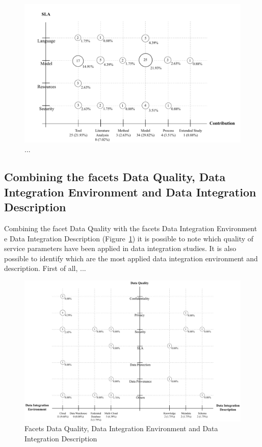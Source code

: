 \begin{figure}[h!]
\centering
\includegraphics[scale=0.7]{figs/bubble-charts/SLA-Contribution.pdf}
\caption{...}
\end{figure}


\subsection{Combining the facets Data Quality, Data Integration Environment and Data Integration Description}

Combining the facet Data Quality with the facets Data Integration Environment e Data Integration Description
(Figure~\ref{fig:facet4}) it is possible to note which quality of service parameters have been applied in
data integration studies.
It is also possible to identify which are the most applied data integration environment and description.
First of all, ...

\begin{figure}[h!]
\centering
\includegraphics[scale=0.53]{figs/bubble-charts/Data-Quality-DI.pdf}
\caption{Facets Data Quality, Data Integration Environment and Data Integration Description}\label{fig:facet4}
\end{figure}
